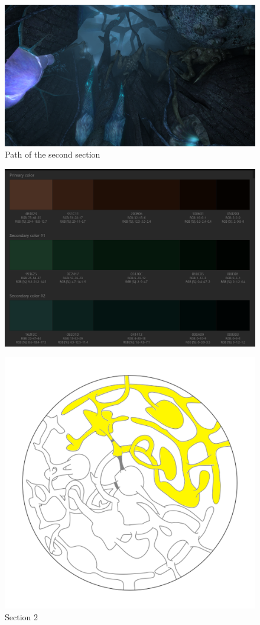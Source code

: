 \vspace*{0.3cm}
\begin{figure}[H]
	\centering
	\includegraphics[width=0.8\linewidth]{images/visual_ref/15_giant_chasm/chasm_section_2.png}
	\caption*{Path of the second section}
\end{figure}

\begin{figure}[H]
	\centering
	\includegraphics[width=0.8\linewidth]{images/visual_ref/15_giant_chasm/pallette/pallette_section_02.png}
\end{figure}

\begin{figure}[H]
	\centering
	\includegraphics[width=0.7\linewidth]{images/map/2D_map_section_02.png}
	\caption*{Section 2}
\end{figure}

